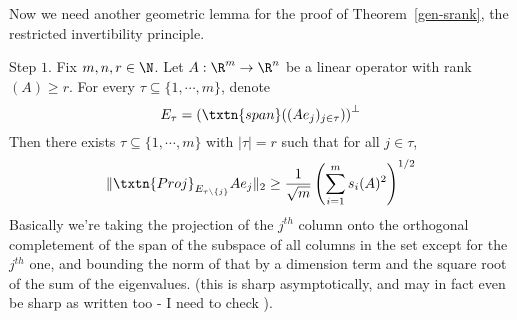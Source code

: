 Now we need another geometric lemma for the proof of  Theorem~\ref{gen-srank}, the restricted invertibility principle. 

\begin{lem} Step $1$. 
Fix $m, n, r \in \N$. Let $A: \R^m \to \R^n$ be a linear operator with rank$(A) \geq r$. For every $\tau \subseteq \{1, \cdots, m\}$, denote
\[
E_{\tau} = \left(\txtn{span}((Ae_j)_{j \in \tau})\right)^{\perp}
\] 
Then there exists $\tau \subseteq \{1, \cdots, m\}$ with $|\tau| = r$ such that for all $j \in \tau$, 
\[
\|\txtn{Proj}_{E_{\tau \setminus \{j\}}} Ae_j\|_2 \geq \frac{1}{\sqrt{m}}\left(\sum_{i = 1}^m s_i(A)^2\right)^{1/2}
\]
Basically we're taking the projection of the $j^{th}$ column onto the orthogonal completement of the span of the subspace of all columns in the set except for the $j^{th}$ one, and bounding the norm of that by a dimension term and the square root of the sum of the eigenvalues. 
(this is sharp asymptotically, and may in fact even be sharp as written too - I need to check ). 
\end{lem}
